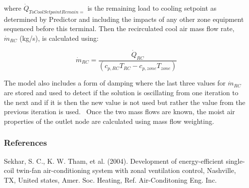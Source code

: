 where \({\dot Q_{ToCoolSetpointRemain = }}\) is the remaining load to cooling setpoint as determined by Predictor and including the impacts of any other zone equipment sequenced before this terminal. Then the recirculated cool air mass flow rate, \({\dot m_{RC}}\) (kg/s), is calculated using:

\begin{equation}
{\dot m_{RC}} = \frac{{{{\dot Q}_{RC}}}}{{\left( {{c_{p,RC}}{T_{RC}} - {c_{p,zone}}{T_{zone}}} \right)}}
\end{equation}

The model also includes a form of damping where the last three values for \({\dot m_{RC}}\) are stored and used to detect if the solution is oscillating from one iteration to the next and if it is then the new value is not used but rather the value from the previous iteration is used.~ Once the two mass flows are known, the moist air properties of the outlet node are calculated using mass flow weighting.

\subsubsection{References}\label{references-6}

Sekhar, S. C., K. W. Tham, et al. (2004). Development of energy-efficient single-coil twin-fan air-conditioning system with zonal ventilation control, Nashville, TX, United states, Amer. Soc. Heating, Ref. Air-Conditoning Eng. Inc.
